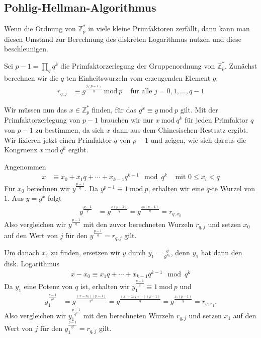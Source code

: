 \documentclass[
  a4paper,
  11pt,
]{scrartcl}
\theoremstyle{plain}
\theoremstyle{definition}
\theoremstyle{remark}
\newcommand{\Z}{\mathbb{Z}}
\newcommand{\Mod}[1]{\ \mathrm{mod}\ #1}
\begin{document}
\subsection{Pohlig-Hellman-Algorithmus}
\label{sub:pohlig_hellman_algorithmus}

Wenn die Ordnung von $\Z_p^*$ in viele kleine Primfaktoren zerfällt, dann kann
man diesen Umstand zur Berechnung des diskreten Logarithmus nutzen und diese
beschleunigen.

Sei $p-1 = \prod\limits_q q^k$ die Primfaktorzerlegung der Gruppenordnung von
$\Z_p^*$. Zunächst berechnen wir die $q$-ten Einheitswurzeln vom erzeugenden
Element $g$:
\begin{align*}
  r_{q, j} &
    \equiv g^{\frac{j(p-1)}{q}} \Mod{p} &
    \text{ für alle } j = 0, 1, \ldots, q-1
\end{align*}

Wir müssen nun das $x \in \Z_p^*$ finden, für das $g^x \equiv y \Mod{p}$ gilt.
Mit der Primfaktorzerlegung von $p-1$ brauchen wir nur $x \Mod{q^k}$ für jeden
Primfaktor $q$ von $p-1$ zu bestimmen, da sich $x$ dann aus dem Chinesischen
Restsatz ergibt. Wir fixieren jetzt einen Primfaktor $q$ von $p-1$ und zeigen,
wie sich daraus die Kongruenz $x \Mod{q^k}$ ergibt.

Angenommen
\begin{align*}
  x & \equiv x_0 + x_1 q + \cdots + x_{k-1} q^{k-1} \mod q^k
    & \text{ mit } 0 \leq x_i < q
\end{align*}
Für $x_0$ berechnen wir $y^{\frac{p-1}{q}}$. Da $y^{p-1} \equiv 1 \Mod{p}$,
erhalten wir eine $q$-te Wurzel von $1$. Aus $y = g^x$ folgt
\begin{align*}
  y^{\frac{p-1}{q}} &
    = g^{\frac{x(p-1)}{q}}
    = g^{\frac{x_0 (p-1)}{q}}
    = r_{q, x_0}
\end{align*}
Also vergleichen wir $y^{\frac{p-1}{q}}$ mit den zuvor berechneten Wurzeln
$r_{q, j}$ und setzen $x_0$ auf den Wert von $j$ für den
$y^{\frac{p-1}{q}} = r_{q, j}$ gilt.

Um danach $x_1$ zu finden, ersetzen wir $y$ durch $y_1 = \frac{y}{g^{x_0}}$,
denn $y_1$ hat dann den disk. Logarithmus
\begin{align*}
  x - x_0 \equiv x_1 q + \cdots + x_{k-1} q^{k-1} \mod q^k
\end{align*}
Da $y_1$ eine Potenz von $q$ ist, erhalten wir
$y_1^{\frac{p-1}{q}} \equiv 1 \Mod{p}$ und
\begin{align*}
  y_1^{\frac{p-1}{q^2}} &
    = g^{\frac{(x-x_0) (p-1)}{q^2}}
    = g^{\frac{(x_1 + x_2 q + \cdots) (p-1)}{q}}
    = g^{\frac{x_1 (p-1)}{q}}
    = r_{q, x_1}.
\end{align*}
Also vergleichen wir $y_1^{\frac{p-1}{q^2}}$ mit den berechneten Wurzeln
$r_{q, j}$ und setzen $x_1$ auf den Wert von $j$ für den
$y_1^{\frac{p-1}{q^2}} = r_{q, j}$ gilt.
\end{document}
